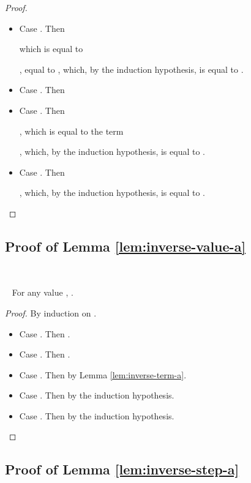 \documentclass{LMCS}
\newcommand{\recap}[2]{\medskip\noindent{\bf #1 \ref{#2}.}~}
\begin{document}
\begin{figure}
{\begin{proof}
\begin{itemize}
      
      
      
      
      ,
      which, by the induction hypothesis, is equal to
      .

    \item Case . Then 
      
      
      which is equal to
      
      
      , equal to
      ,
      which, by the induction hypothesis, is equal to
      .

    \item Case . Then 
    \item Case . Then 
      
      , which is equal to
      the term
      
      
      
      ,
      which, by the induction hypothesis, is equal to
      .

    \item Case . Then
      
      
      
      
      
      ,
      which, by the induction hypothesis, is equal to
      .
      \qedhere
  \end{itemize}
\end{proof}


\subsection{Proof of Lemma \ref{lem:inverse-value-a}}\label{proof:inverse-value-a}~

\recap{Lemma}{lem:inverse-value-a} For any value , .
\begin{proof}
  By induction on .
  \begin{itemize}
    \item Case . Then .
    \item Case . Then .
    \item Case . Then 
      by Lemma \ref{lem:inverse-term-a}.
    \item Case . Then 
      by the induction hypothesis.
    \item Case . Then 
      by the induction hypothesis.
      \qedhere
  \end{itemize}
\end{proof}


\subsection{Proof of Lemma \ref{lem:inverse-step-a}}\label{proof:inverse-step-a}~

}
\end{figure}
\end{document}
